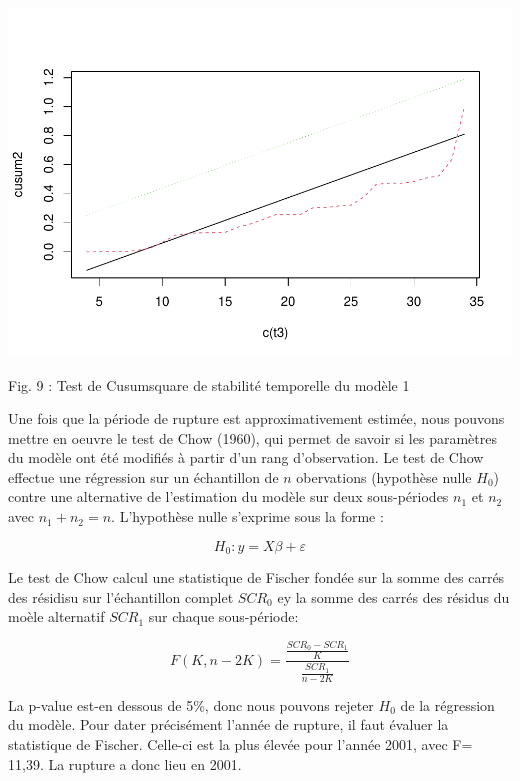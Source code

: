 \documentclass[
]{article}
\begin{document}
\begin{center}\includegraphics[width=0.7\linewidth,height=0.7\textheight]{Projet_econometrie_II_files/figure-latex/unnamed-chunk-8-1} \end{center}

Fig. 9 : Test de Cusumsquare de stabilité temporelle du modèle 1

Une fois que la période de rupture est approximativement estimée, nous
pouvons mettre en oeuvre le test de Chow (1960), qui permet de savoir si
les paramètres du modèle ont été modifiés à partir d'un rang
d'observation. Le test de Chow effectue une régression sur un
échantillon de \(n\) obervations (hypothèse nulle \(H_0\)) contre une
alternative de l'estimation du modèle sur deux sous-périodes \(n_1\) et
\(n_2\) avec \(n_1 + n_2 = n\). L'hypothèse nulle s'exprime sous la
forme :

\begin{equation}
\label{eq:H0chow}
H_0 : y = X\beta + \varepsilon 
\end{equation}

Le test de Chow calcul une statistique de Fischer fondée sur la somme
des carrés des résidisu sur l'échantillon complet \(SCR_0\) ey la somme
des carrés des résidus du moèle alternatif \(SCR_1\) sur chaque
sous-période:

\begin{equation}
\label{eq:statF}
F(K,n-2K) = \frac{\frac{SCR_0 - SCR_1}{K}}{\frac{SCR_1}{n - 2K}}
\end{equation}

La p-value est-en dessous de 5\%, donc nous pouvons rejeter \(H_0\) de
la régression du modèle. Pour dater précisément l'année de rupture, il
faut évaluer la statistique de Fischer. Celle-ci est la plus élevée pour
l'année 2001, avec F= 11,39. La rupture a donc lieu en 2001.
\end{document}
